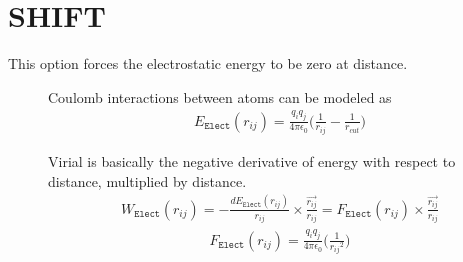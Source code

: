 \documentclass[letterpaper,10pt,english]{sphinxmanual}
\begin{document}
\section{SHIFT}
\label{\detokenize{electrostatic:shift}}
This option forces the electrostatic energy to be zero at  distance.
\begin{description}
\item[{}] \leavevmode
Coulomb interactions between atoms can be modeled as
\begin{equation*}
\begin{split}E_{\texttt{Elect}}(r_{ij}) = \frac{q_i q_j}{4\pi \epsilon_0} \Big( \frac{1}{r_{ij}} - \frac{1}{r_{cut}} \Big)\end{split}
\end{equation*}
\item[{}] \leavevmode
Virial is basically the negative derivative of energy with respect to distance, multiplied by distance.
\begin{equation*}
\begin{split}W_{\texttt{Elect}}(r_{ij}) = -\frac{dE_{\texttt{Elect}}(r_{ij})}{r_{ij}}\times \frac{\overrightarrow{r_{ij}}}{{r_{ij}}} = F_{\texttt{Elect}}(r_{ij}) \times \frac{\overrightarrow{r_{ij}}}{{r_{ij}}}\end{split}
\end{equation*}\begin{equation*}
\begin{split}F_{\texttt{Elect}}(r_{ij}) = \frac{q_i q_j}{4\pi \epsilon_0} \Big( \frac{1}{{r_{ij}}^2} \Big)\end{split}
\end{equation*}
\end{description}
\end{document}
